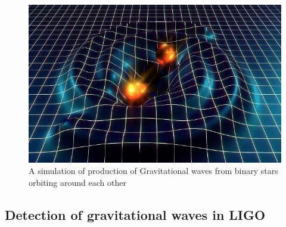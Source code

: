 \documentclass[colorlinks=true,pdfstartview=FitV,linkcolor=blue,
            citecolor=red,urlcolor=magenta]{ligodoc}
\begin{document}

 \begin{figure}[htbp]
\begin{center}
\includegraphics[width=6in]{gwave.jpg}
\caption{A simulation of production of Gravitational waves from binary stars orbiting around each other }
\label{fig:gwave}
\end{center}
\end{figure}      


\subsection{Detection of gravitational waves in LIGO}
\end{document}
